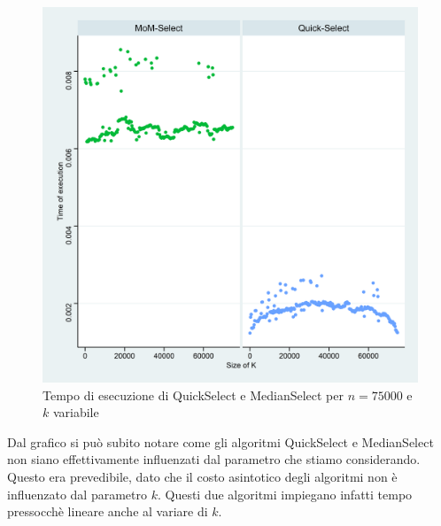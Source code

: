 \documentclass{article}
\begin{document}
	\begin{figure}[h!]
  		\includegraphics[width=\linewidth]{images/MoM_Quick_graph.png}
  		\caption{Tempo di esecuzione di QuickSelect e MedianSelect per $n=75000$ e $k$ variabile}
  		\label{fig:graph3}
	\end{figure}
	
	Dal grafico si può subito notare come gli algoritmi QuickSelect e MedianSelect non siano effettivamente influenzati dal parametro che stiamo considerando. Questo era prevedibile, dato che il costo asintotico degli algoritmi non è influenzato dal parametro $k$. Questi due algoritmi impiegano infatti tempo pressocchè lineare anche al variare di $k$.
	\newpage
	
\end{document}

